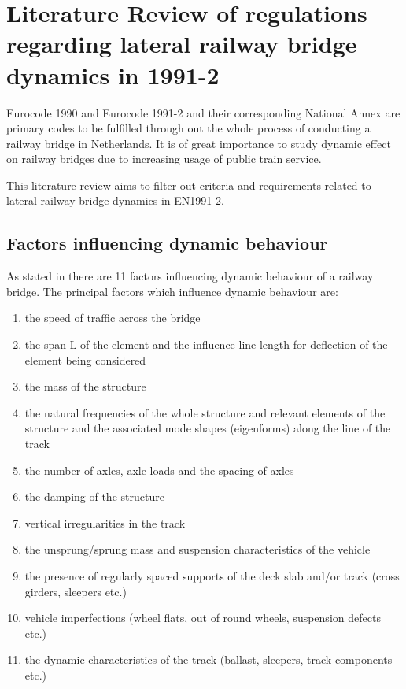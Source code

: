 \chapter{Literature Review of regulations regarding lateral railway bridge dynamics in 1991-2} 
Eurocode 1990 and Eurocode 1991-2 and their corresponding National Annex are primary codes to be fulfilled through out the whole process of conducting a railway bridge in Netherlands. It is of great importance to study dynamic effect on railway bridges due to increasing usage of public train service.

This literature review aims to filter out criteria and requirements related to lateral railway bridge dynamics in EN1991-2.


\section{Factors influencing dynamic behaviour}
As stated in\cite[6.4.2]{EC12} there are 11 factors influencing dynamic behaviour of a railway bridge. The principal factors which influence dynamic behaviour are:
\begin{enumerate}[-]
	\item the speed of traffic across the bridge
	\item the span L of the element and the influence line length for deflection of the element being considered
	\item the mass of the structure
	\item the natural frequencies of the whole structure and relevant elements of the structure and the associated mode shapes (eigenforms) along the line of the track
	\item the number of axles, axle loads and the spacing of axles
	\item the damping of the structure
	\item vertical irregularities in the track
	\item the unsprung/sprung mass and suspension characteristics of the vehicle
	\item the presence of regularly spaced supports of the deck slab and/or track (cross girders, sleepers etc.)
	\item vehicle imperfections (wheel flats, out of round wheels, suspension defects etc.)
	\item the dynamic characteristics of the track (ballast, sleepers, track components etc.)
\end{enumerate}

